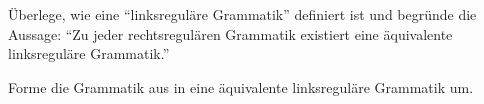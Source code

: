 \documentclass[10pt, a4paper]{scrartcl}
\begin{document}
\begin{aufgabe}[symbol=\symStern]
	\label{aufg:zusatz-linksreg}
	Überlege, wie eine \enquote{linksreguläre Grammatik} definiert ist und begründe die Aussage: \enquote{Zu jeder rechtsregulären Grammatik existiert eine äquivalente linksreguläre Grammatik.}
	
	Forme die Grammatik aus  in eine äquivalente linksreguläre Grammatik um. 
\end{aufgabe}
\end{document}
